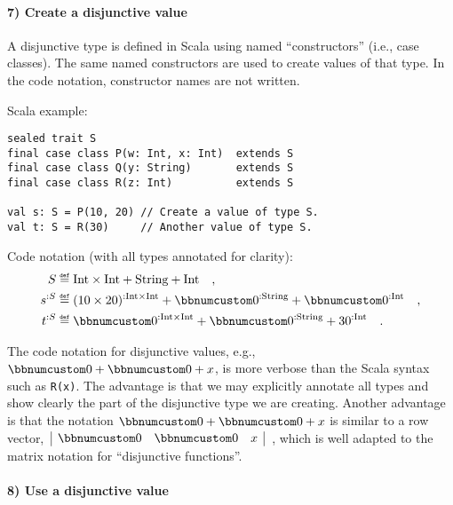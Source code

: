 \paragraph{7) Create a disjunctive value}

A disjunctive type is defined in Scala using named \textsf{``}constructors\textsf{''}
(i.e., case classes). The same named constructors are used to create
values of that type. In the code notation, constructor names are not
written.

Scala example:
\begin{lstlisting}
sealed trait S
final case class P(w: Int, x: Int)  extends S
final case class Q(y: String)       extends S
final case class R(z: Int)          extends S

val s: S = P(10, 20) // Create a value of type S.
val t: S = R(30)     // Another value of type S.
\end{lstlisting}
Code notation (with all types annotated for clarity):
\begin{align*}
S & \triangleq\text{Int}\times\text{Int}+\text{String}+\text{Int}\quad,\\
s^{:S} & \triangleq(10\times20)^{:\text{Int}\times\text{Int}}+\bbnum 0^{:\text{String}}+\bbnum 0^{:\text{Int}}\quad,\\
t^{:S} & \triangleq\bbnum 0^{:\text{Int}\times\text{Int}}+\bbnum 0^{:\text{String}}+30^{:\text{Int}}\quad.
\end{align*}

The code notation for disjunctive values, e.g., $\bbnum 0+\bbnum 0+x$,
is more verbose than the Scala syntax such as \lstinline!R(x)!. The
advantage is that we may explicitly annotate all types and show clearly
the part of the disjunctive type we are creating. Another advantage
is that the notation $\bbnum 0+\bbnum 0+x$ is similar to a row vector,
$\,\begin{array}{|ccc|}
\bbnum 0 & \bbnum 0 & x\end{array}$~, which is well adapted to the matrix notation for \textsf{``}disjunctive
functions\textsf{''}.

\paragraph{8) Use a disjunctive value}

